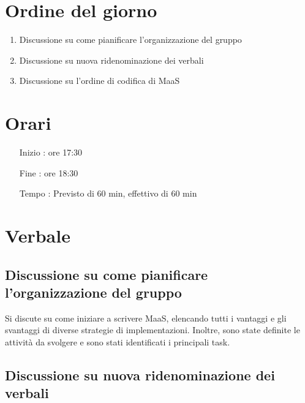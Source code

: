 \documentclass[11pt]{meetingmins}
\begin{document}
\maketitle

\section{Ordine del giorno}

\begin{enumerate}

\item Discussione su come pianificare l'organizzazione del gruppo

\item Discussione su nuova ridenominazione dei verbali

\item Discussione su l'ordine di codifica di MaaS

\end{enumerate}

\section{Orari}

\begin{itemize}
\item[Inizio]: ore 17:30
\item[Fine]: ore 18:30
\item[Tempo]: Previsto di 60 min, effettivo di 60 min

\end{itemize}

\section{Verbale}

\subsection{Discussione su come pianificare l'organizzazione del gruppo}

Si discute su come iniziare a scrivere MaaS, elencando tutti i vantaggi e gli svantaggi di diverse strategie di implementazioni. Inoltre, sono state definite le attività da svolgere e sono stati identificati i principali task.

\subsection{Discussione su nuova ridenominazione dei verbali}
\end{document}
